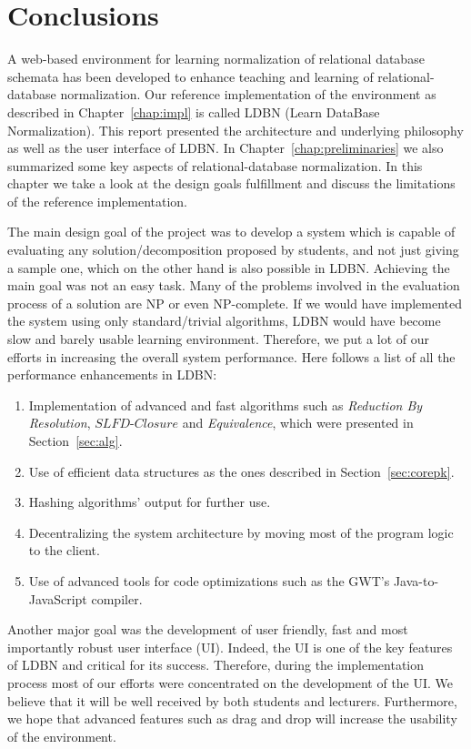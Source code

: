 \chapter{Conclusions}
\label{chap:conclusion}
A web-based environment for learning normalization of relational database schemata has been developed to
enhance teaching and learning of relational-database normalization. Our reference implementation of the 
environment as described in Chapter~\ref{chap:impl} is called LDBN (Learn DataBase Normalization). 
This report presented the architecture and underlying philosophy as well as the user interface of LDBN. In
Chapter~\ref{chap:preliminaries} we also summarized some key aspects of relational-database normalization. 
In this chapter we take a look at the design goals fulfillment and discuss the limitations of 
the reference implementation.

The main design goal of the project was to develop a system which is capable of evaluating any 
solution/decomposition
proposed by students, and not just giving a sample one, which on the other hand is also possible
in LDBN. Achieving the main goal was not an easy task. Many of the problems involved
in the evaluation process of a solution are NP or even NP-complete. 
If we would have implemented the system using only standard/trivial algorithms, LDBN
would have become slow and barely usable learning environment. Therefore,
we put a lot of our efforts in increasing the overall system performance. Here follows a list
of all the performance enhancements in LDBN:
\begin{enumerate}
  \item Implementation of advanced and fast algorithms such as 
    \textit{Reduction By Resolution}, $SLFD$-$Closure$ and \textit{Equivalence}, which were presented in Section~\ref{sec:alg}.
  \item Use of efficient data structures as the ones described in Section~\ref{sec:corepk}.
  \item Hashing algorithms' output for further use.
  \item Decentralizing the system architecture by moving most of the program logic to the client.
  \item Use of advanced tools for code optimizations such as the GWT's Java-to-JavaScript compiler.   
\end{enumerate}

Another major goal was the
development of user friendly, fast and most importantly robust
user interface (UI). Indeed, the UI is one of the key features of LDBN and critical for its
success. Therefore, during the implementation process 
most of our efforts were concentrated on the development of the UI. We believe that it will be well received 
by both students and lecturers.
Furthermore, we hope that advanced features such as drag and drop will 
increase the usability of the environment.

